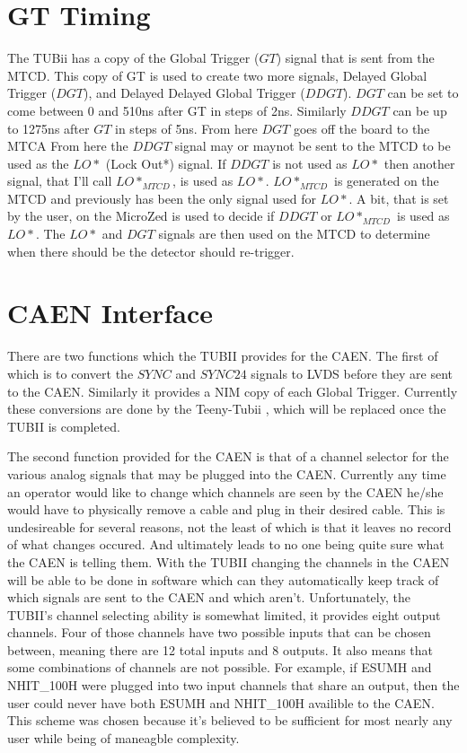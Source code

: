 \documentclass[11pt,a4paper]{article}
\begin{document}
\section{GT Timing}
\label{GTTiming}
The TUBii has a copy of the Global Trigger ($GT$) signal that is sent from the MTCD. This copy of GT is used to create two more signals, Delayed Global Trigger ($DGT$), and Delayed Delayed Global Trigger ($DDGT$). $DGT$ can be set to come between 0 and 510ns after GT in steps of 2ns. Similarly $DDGT$ can be up to 1275ns after $GT$ in steps of 5ns. From here $DGT$ goes off the board to the MTCA  From here the $DDGT$ signal may or maynot be sent to the MTCD to be used as the $LO*$ (Lock Out*) signal. If $DDGT$ is not used as $LO*$ then another signal, that I'll call $LO*_{MTCD}$, is used as $LO*$. $LO*_{MTCD}$ is generated on the MTCD and previously has been the only signal used for $LO*$. A bit, that is set by the user, on the MicroZed is used to decide if $DDGT$ or $LO*_{MTCD}$ is used as $LO*$. 
The $LO*$ and $DGT$ signals are then used on the MTCD to determine when there should be the detector should re-trigger.
 
\section{CAEN Interface}
There are two functions which the TUBII provides for the CAEN. The first of which is to convert the $SYNC$ and $SYNC24$ signals to LVDS before they are sent to the CAEN. Similarly it provides a NIM copy of each Global Trigger. Currently these conversions are done by the Teeny-Tubii \cite{ElectronicsUpdate}, which will be replaced once the TUBII is completed. 

 The second function provided for the CAEN is that of a channel selector for the various analog signals that may be plugged into the CAEN. Currently any time an operator would like to change which channels are seen by the CAEN he/she would have to physically remove a cable and plug in their desired cable. This is undesireable for several reasons, not the least of which is that it leaves no record of what changes occured. And ultimately leads to no one being quite sure what the CAEN is telling them. With the TUBII changing the channels in the CAEN will be able to be done in software which can they automatically keep track of which signals are sent to the CAEN and which aren't. Unfortunately, the TUBII's channel selecting ability is somewhat limited, it provides eight output channels. Four of those channels have two possible inputs that can be chosen between, meaning there are 12 total inputs and 8 outputs. It also means that some combinations of channels are not possible. For example, if ESUMH and NHIT\_100H were plugged into two input channels that share an output, then the user could never have both ESUMH and NHIT\_100H availible to the CAEN. This scheme was chosen because it's believed to be sufficient for most nearly any user while being of maneagble complexity.
 
\end{document}
